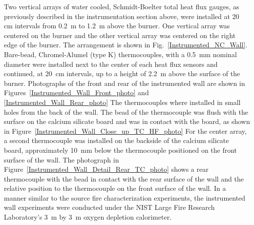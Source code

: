 \documentclass[twoside]{uocthesis}
\begin{document}
{Two vertical arrays of water cooled, Schmidt-Boelter total heat flux gauges, as previously described in the instrumentation section above, were installed at 20 cm intervals from 0.2~m to 1.2~m above the burner.  One vertical array was centered on the burner and the other vertical array was centered on the right edge of the burner. The arrangement is shown in Fig.~\ref{Instrumented_NC_Wall}. Bare-bead, Chromel-Alumel (type K) thermocouples, with a 0.5~mm nominal diameter were installed next to the center of each heat flux sensors and continued, at 20~cm intervals, up to a height of 2.2~m above the surface of the burner. Photographs of the front and rear of the instrumented wall are shown in Figures~\ref{Instrumented_Wall_Front_photo} and \ref{Instrumented_Wall_Rear_photo} The thermocouples where installed in small holes from the back of the wall.  The bead of the thermocouple was flush with the surface on the calcium silicate board and was in contact with the board, as shown in Figure~\ref{Instrumented_Wall_Close_up_TC_HF_photo} For the center array, a second thermocouple was installed on the backside of the calcium silicate board, approximately 10~mm below the thermocouple positioned on the front surface of the wall. The photograph in Figure~\ref{Instrumented_Wall_Detail_Rear_TC_photo} shows a rear thermocouple with the bead in contact with the rear surface of the wall and the relative position to the thermocouple on the front surface of the wall. In a manner similar to the source fire characterization experiments, the instrumented wall experiments were conducted under the NIST Large Fire Research Laboratory's 3~m by 3~m oxygen depletion calorimeter.

}
\end{document}
